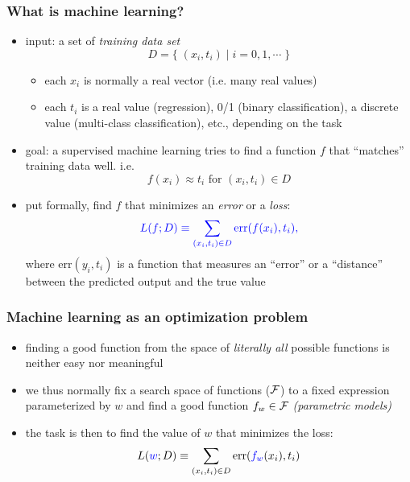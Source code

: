 \documentclass[12pt,dvipdfmx]{beamer}
\newcommand{\ao}[1]{{\color{blue}#1}}
\begin{document}
\begin{frame}
\frametitle{What is machine learning?}
\begin{itemize}
\item<1-> \ao{input:} a set of \ao{\emph{training data set}}
\[ D = \{\;(x_i,t_i)\;|\; i = 0, 1, \cdots \;\} \]

\begin{itemize}
\item<1-> each \ao{$x_i$} is normally a real vector (i.e. many real values)
\item<1-> each \ao{$t_i$} is a real value (regression), 
  0/1 (binary classification),
  a discrete value (multi-class classification), 
  etc., depending on the task
\end{itemize}

\item<2-> \ao{goal:} a supervised machine learning tries 
to find a function $f$ that ``matches'' training data well. i.e.
\[ f(x_i) \approx t_i \mbox{ for } (x_i,t_i) \in D \]

\item<2-> put formally, find $f$ that minimizes 
  an \emph{error} or a \emph{loss}:
\[ \ao{L(f; D) \equiv \sum_{(x_i,t_i)\in D} \mbox{err}(f(x_i), t_i),} \]
where \ao{$\mbox{err}(y_i, t_i)$} is a function that measures
an ``error'' or a  ``distance'' 
between the predicted output and the true value
\end{itemize}
\end{frame}

\begin{frame}
\frametitle{Machine learning as an optimization problem}
\begin{itemize}
\item<1-> finding a good function from 
  the space of {\it literally all} possible functions is neither easy nor meaningful

\item<1-> we thus normally fix a search space of functions (${\cal{F}}$)
  to a fixed expression parameterized by $w$ 
  and find a good function $f_w \in {\cal{F}}$ \ao{\emph{(parametric models)}}

\item<2-> the task is then to find the value of $w$ 
  that minimizes the loss:
\[ L(\ao{w}; D) \equiv \sum_{(x_i,t_i)\in D} \mbox{err}(\ao{f_w}(x_i), t_i) \]
\end{itemize}
\end{frame}

\end{document}
